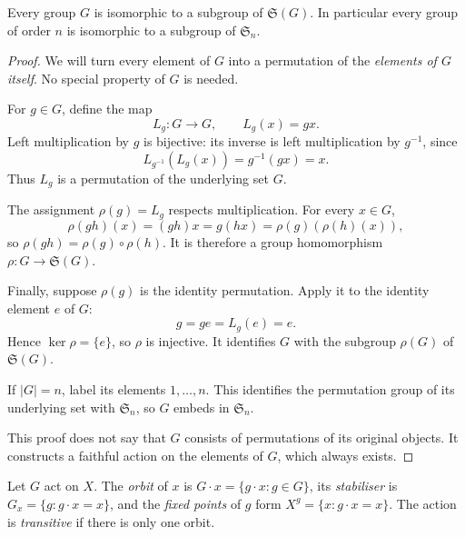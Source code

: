 \begin{theorem}[Cayley]\label{thm:cayley}
Every group $G$ is isomorphic to a subgroup of $\mathfrak S(G)$. In particular every group of order $n$ is isomorphic to a subgroup of $\mathfrak S_n$.
\end{theorem}
\begin{proof}
We will turn every element of $G$ into a permutation of the
\emph{elements of $G$ itself}. No special property of $G$ is needed.

For $g\in G$, define the map
\[
L_g:G\longrightarrow G,\qquad L_g(x)=gx.
\]
Left multiplication by $g$ is bijective: its inverse is
left multiplication by $g^{-1}$, since
\[
L_{g^{-1}}(L_g(x))=g^{-1}(gx)=x.
\]
Thus $L_g$ is a permutation of the underlying set $G$.

The assignment $\rho(g)=L_g$ respects multiplication.
For every $x\in G$,
\[
\rho(gh)(x)=(gh)x
=g(hx)=\rho(g)(\rho(h)(x)),
\]
so $\rho(gh)=\rho(g)\circ\rho(h)$.
It is therefore a group homomorphism
$\rho:G\to\mathfrak S(G)$.

Finally, suppose $\rho(g)$ is the identity permutation.
Apply it to the identity element $e$ of $G$:
\[
g=ge=L_g(e)=e.
\]
Hence $\ker\rho=\{e\}$, so $\rho$ is injective.
It identifies $G$ with the subgroup $\rho(G)$ of
$\mathfrak S(G)$.

If $|G|=n$, label its elements $1,\ldots,n$.
This identifies the permutation group of its underlying
set with $\mathfrak S_n$, so $G$ embeds in $\mathfrak S_n$.

This proof does not say that $G$ consists of permutations
of its original objects. It constructs a faithful action
on the elements of $G$, which always exists.
\end{proof}

\begin{definition}
Let $G$ act on $X$. The \emph{orbit} of $x$ is $G\cdot x=\{g\cdot x:g\in G\}$, its \emph{stabiliser} is $G_x=\{g:g\cdot x=x\}$, and the \emph{fixed points} of $g$ form $X^g=\{x:g\cdot x=x\}$. The action is \emph{transitive} if there is only one orbit.
\end{definition}

